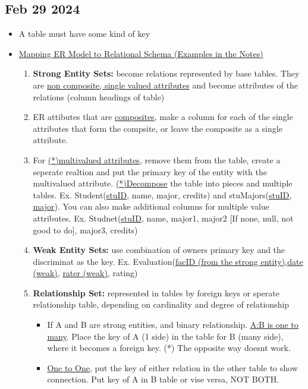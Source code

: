 \documentclass[12pt]{article}
\begin{document}
\subsection*{Feb 29 2024}

\begin{itemize}
		\item A table must have some kind of key
		\item \underline{Mapping ER Model to Relational Schema (Examples in the Notes)}
			\begin{enumerate}
				\item \textbf{Strong Entity Sets:} become relations represented by base tables. They are \underline{
					non composite, single valued attributes} and become attributes of the 
					relations (column headings of table)
		  		\item ER attibutes that are \underline{composites}, make a column for each of the single attributes
					that form the compsite, or leave the composite as a single attribute.
				\item For \underline{(*)multivalued attributes}, remove them from the table, create a 
					seperate realtion
					and put the primary key of the entity with the multivalued attribute. \underline{(*)Decompose} the 
					table into pieces and multiple tables. Ex. Student(\underline{stuID}, name, major, credits) 
					and stuMajors(\underline{stuID}, \underline{major}). You can also make additional columns for
					multiple value attributes. Ex. Studnet(\underline{stuID}, name, major1, major2 
					[If none, null, not good to do], major3, credits)
		  		\item \textbf{Weak Entity Sets:} use combination of owners primary key and the discriminat as the
					key. Ex. Evaluation(\underline{facID (from the strong entity)},\underline{date (weak)},
					\underline{rater (weak)}, rating)
		  		\item \textbf{Relationship Set:} represented in tables by foreign keys or sperate relationship table,
					depending on cardinality and degree of relationship
					\begin{itemize}
						\item If A and B are strong entities, and binary relationship. \underline{A:B is one to many}.
							Place the key of A (1 side) in the table for B (many side), where it becomes a
							foreign key. (*) The opposite way doesnt work. 
						\item \underline{One to One}, put the key of either relation in the other table to show 
							connection. Put key of A in B table or vise versa, NOT BOTH. 

\end{itemize}
\end{enumerate}
\end{itemize}
\end{document}
